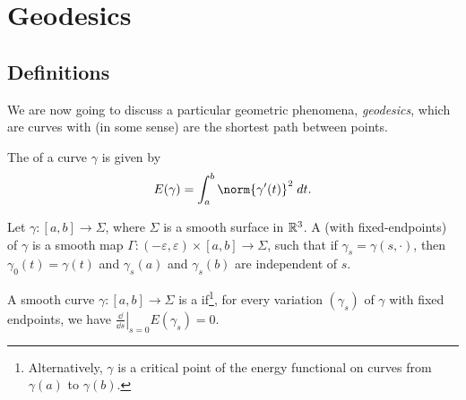 \documentclass[a4paper, 10pt, twocolumn]{amsart}
\begin{document}






\section{Geodesics}

\subsection{Definitions}

We are now going to discuss a particular geometric phenomena, \emph{geodesics}, which are curves with (in some sense) are the shortest path between points.

\begin{definition}[Energy]
    The  of a curve $\gamma$ is given by 
    $$E(\gamma) = \int_a^b \norm{\gamma'(t)}^2 \dd t.$$
\end{definition}

\begin{definition}
    Let $\gamma: [a, b] \rightarrow \Sigma$, where $\Sigma$ is a smooth surface in $\mathbb{R}^3$. A  (with fixed-endpoints) of $\gamma$ is a smooth map $\Gamma: (-\varepsilon, \varepsilon) \times [a, b] \rightarrow \Sigma$, such that if $\gamma_s = \gamma(s, \cdot)$, then $\gamma_0(t) = \gamma(t)$ and $\gamma_s(a)$ and $\gamma_s(b)$ are independent of $s$.
\end{definition}

\begin{definition}[Geodesic]
    A smooth curve $\gamma: [a, b] \rightarrow \Sigma$ is a  if\footnote{Alternatively, $\gamma$ is a critical point of the energy functional on curves from $\gamma(a)$ to $\gamma(b)$.}, for every variation $(\gamma_s)$ of $\gamma$ with fixed endpoints, we have $\left.\frac{\dd}{\dd s}\right|_{s = 0} E(\gamma_s) = 0$.
\end{definition}
\end{document}
